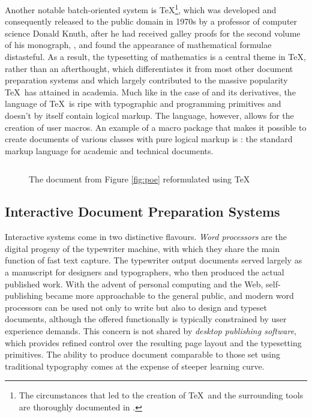 \documentclass{book}
\begin{document}
Another notable batch-oriented system is \TeX{}\footnote{
  The circumstances that led to the creation of \TeX\ and the surrounding tools
  are thoroughly documented in \cite{knuth98}.
}, which was developed and consequently released to the public domain in 1970s
by a professor of computer science Donald Knuth, after he had received galley
proofs for the second volume of his monograph, , and found the appearance of mathematical formulae distasteful.
As a result, the typesetting of mathematics is a central theme in \TeX, rather
than an afterthought, which differentiates it from most other document
preparation systems and which largely contributed to the massive popularity
\TeX\ has attained in academia. Much like in the case of  and
its derivatives, the language of \TeX\ is ripe with typographic and programming
primitives and doesn't by itself contain logical markup. The language, however,
allows for the creation of user macros. An example of a macro package that makes
it possible to create documents of various classes with pure logical markup is
\inx{\LaTeX}: the standard markup language for academic and technical documents.

\begin{figure}
  \inputminted{tex}{examples/02/poe.tex}
  \caption{The  document from Figure \ref{fig:poe}
    reformulated using \TeX}
\end{figure}

\subsection{Interactive Document Preparation Systems}
Interactive systems come in two distinctive flavours. \emph{Word processors}
 are
the digital progeny of the typewriter machine, with which they share the main
function of fast text capture. The typewriter output documents served largely as
a manuscript for designers and typographers, who then produced the actual
published work. With the advent of personal computing and the Web,
self-publishing became more approachable to the general public, and modern word
processors can be used not only to write but also to design and typeset
documents, although the offered functionally is typically constrained by user
experience demands. This concern is not shared by \emph{desktop publishing
software},
which provides refined control over the resulting page layout and the
typesetting primitives. The ability to produce document comparable to those set
using traditional typography comes at the expense of steeper learning curve.
\end{document}
